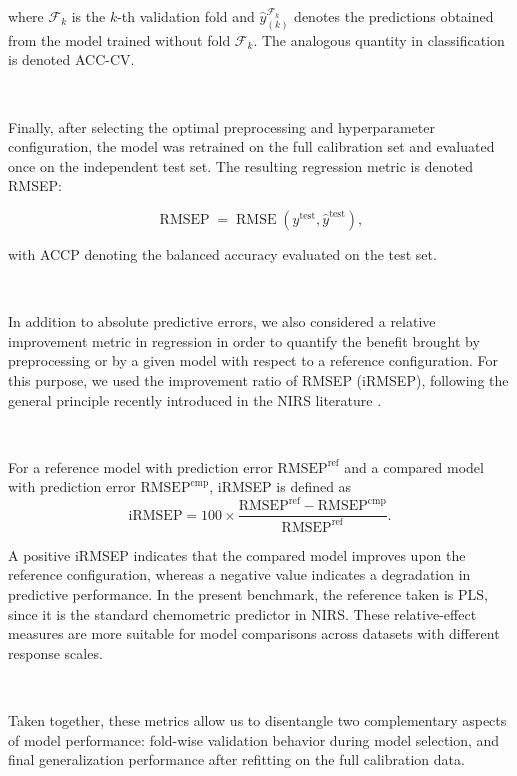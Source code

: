 \documentclass{article}
\begin{document}
where $\mathcal{F}_k$ is the $k$-th validation fold and $\hat{y}^{\mathcal{F}_k}_{(k)}$ denotes the predictions obtained from the model trained without fold $\mathcal{F}_k$. The analogous quantity in classification is denoted ACC-CV.

~

Finally, after selecting the optimal preprocessing and hyperparameter configuration, the model was retrained on the full calibration set and evaluated once on the independent test set. The resulting regression metric is denoted RMSEP:

\begin{equation}
\operatorname{RMSEP}
=
\operatorname{RMSE}(y^{\mathrm{test}},\hat{y}^{\mathrm{test}}),
\end{equation}

with ACCP denoting the balanced accuracy evaluated on the test set.

~

In addition to absolute predictive errors, we also considered a relative improvement metric in regression in order to quantify the benefit brought by preprocessing or by a given model with respect to a reference configuration. For this purpose, we used the improvement ratio of RMSEP (iRMSEP), following the general principle recently introduced in the NIRS literature \cite{wang_comprehensive_2025}.

~

For a reference model with prediction error $\mathrm{RMSEP}^{\mathrm{ref}}$ and a compared model with prediction error $\mathrm{RMSEP}^{\mathrm{cmp}}$, iRMSEP is defined as
\begin{equation}
\mathrm{iRMSEP}
=
100 \times
\frac{
\mathrm{RMSEP}^{\mathrm{ref}}-\mathrm{RMSEP}^{\mathrm{cmp}}
}{
\mathrm{RMSEP}^{\mathrm{ref}}
}.
\end{equation}

A positive iRMSEP indicates that the compared model improves upon the reference configuration, whereas a negative value indicates a degradation in predictive performance. In the present benchmark, the reference taken is PLS, since it is the standard chemometric predictor in NIRS. These relative-effect measures are more suitable for model comparisons across datasets with different response scales.

~

Taken together, these metrics allow us to disentangle two complementary aspects of model performance: fold-wise validation behavior during model selection, and final generalization performance after refitting on the full calibration data.
\end{document}
